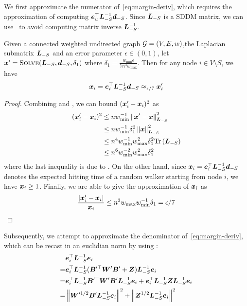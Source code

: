 \documentclass[sigconf]{acmart}
\begin{document}
We first approximate the numerator of~\eqref{eq:margin-deriv}, which requires the approximation of computing \(\boldsymbol{e}_u^\top\boldsymbol{L}_{-S}^{-1}\boldsymbol{d}_{-S}\).
Since \(\boldsymbol{L}_{-S}\) is a SDDM matrix, we can use~ to avoid computing matrix inverse \(\boldsymbol{L}_{-S}^{-1}\).
\begin{lemma}\label{lem:approx-numer}
    Given a connected weighted undirected graph \(\mathcal{G}=(V,E,w)\),the Laplacian submatrix \(\boldsymbol{L}_{-S}\) and an error parameter \(\epsilon\in(0,1)\), let \(\boldsymbol{x}'=\textsc{Solve}(\boldsymbol{L}_{-S},\boldsymbol{d}_{-S},\delta_1)\) where \(\delta_1=\frac{w_{\min}\epsilon}{7n^3w_{\max}}\). Then for any node \(i\in V\setminus S\), we have
    \begin{equation}\label{eq:approx-numer}
        \boldsymbol{x}_i=\boldsymbol{e}_i^\top\boldsymbol{L}_{-S}^{-1}\boldsymbol{d}_{-S}\approx_{\epsilon/7}\boldsymbol{x}'_i
    \end{equation}
\end{lemma}
\begin{proof}

    Combining  and , we can bound \((\boldsymbol{x}'_i-\boldsymbol{x}_i)^2\) as
    \begin{align*}
        (\boldsymbol{x}'_i-\boldsymbol{x}_i)^2
         & \le nw_{\min}^{-1}\left\Vert\boldsymbol{x}'-\boldsymbol{x}\right\Vert^2_{\boldsymbol{L}_{-S}}        \\
         & \le nw_{\min}^{-1}\delta_1^2\left\Vert\boldsymbol{x}\right\Vert^2_{\boldsymbol{L}_{-S}}     \\
         & \le n^4w_{\min}^{-1}w_{\max}^2\delta_1^2\mathrm{Tr}\left(\boldsymbol{L}_{-S}\right) \\
         & \le n^6w_{\min}^{-2}w_{\max}^2\delta_1^2
    \end{align*}
    where the last inequality is due to .
    On the other hand, since \(\boldsymbol{x}_i=\boldsymbol{e}_i^\top\boldsymbol{L}_{-S}^{-1}\boldsymbol{d}_{-S}\) denotes the expected hitting time of a random walker starting from node \(i\), we have \(\boldsymbol{x}_i\ge1\).
    Finally, we are able to give the approximation of \(\boldsymbol{x}_i\) as
    \[\frac{\left|\boldsymbol{x}'_i-\boldsymbol{x}_i \right|}{\boldsymbol{x}_i}\le n^3w_{\max}w_{\min}^{-1}\delta_1=\epsilon/7\]
\end{proof}

Subsequently, we attempt to approximate the denominator of~\eqref{eq:margin-deriv}, which can be recast in an euclidian norm by using :
\begin{equation}\label{eq:denom-solver}
    \begin{split}
        &\boldsymbol{e}_i^\top\boldsymbol{L}_{-S}^{-1}\boldsymbol{e}_i\\
        =&\boldsymbol{e}_i^\top\boldsymbol{L}_{-S}^{-1}(\boldsymbol{B}'^\top\boldsymbol{W}'\boldsymbol{B}'+\boldsymbol{Z})\boldsymbol{L}_{-S}^{-1}\boldsymbol{e}_i\\
        =&\boldsymbol{e}_i^\top\boldsymbol{L}_{-S}^{-1}\boldsymbol{B}'^\top\boldsymbol{W}'\boldsymbol{B}'\boldsymbol{L}_{-S}^{-1}\boldsymbol{e}_i+\boldsymbol{e}_i^\top\boldsymbol{L}_{-S}^{-1}\boldsymbol{Z}\boldsymbol{L}_{-S}^{-1}\boldsymbol{e}_i\\
        =&\left\Vert\boldsymbol{W}'^{1/2}\boldsymbol{B}'\boldsymbol{L}_{-S}^{-1}\boldsymbol{e}_i\right\Vert^2+\left\Vert\boldsymbol{Z}^{1/2}\boldsymbol{L}_{-S}^{-1}\boldsymbol{e}_i\right\Vert^2
    \end{split}
\end{equation}
\end{document}
